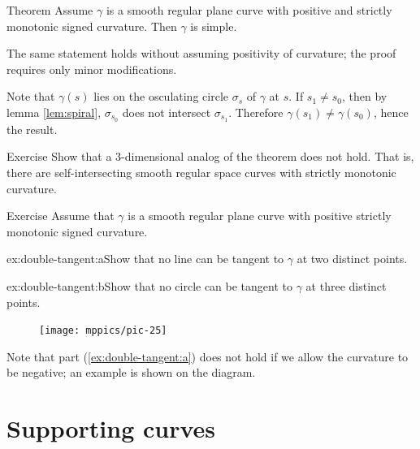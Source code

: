 \begin{thm}{Theorem}\label{thm:spiral}
Assume $\gamma$ is a smooth regular plane curve with positive and strictly monotonic signed curvature. 
Then $\gamma$ is simple.
\end{thm}

The same statement holds without assuming positivity of curvature; the proof requires only minor modifications.

Note that $\gamma(s)$ lies on the osculating circle $\sigma_s$ of $\gamma$ at $s$.
If $s_1\ne s_0$, then by lemma \ref{lem:spiral}, $\sigma_{s_0}$ does not intersect $\sigma_{s_1}$.
Therefore $\gamma(s_1)\ne \gamma(s_0)$,
hence the result.\qeds

\begin{thm}{Exercise}\label{ex:3D-spiral}
Show that a 3-dimensional analog of the theorem does not hold.
That is, there are self-intersecting smooth regular space curves with strictly monotonic curvature.
\end{thm}

\begin{thm}{Exercise}\label{ex:double-tangent}
Assume that $\gamma$ is a smooth regular plane curve with positive strictly monotonic signed curvature.

\begin{subthm}{ex:double-tangent:a}Show that no line can be tangent to $\gamma$ at two distinct points.
\end{subthm}

\begin{subthm}{ex:double-tangent:b}Show that no circle can be tangent to $\gamma$ at three distinct points. 
\end{subthm}

\end{thm} %

{

\begin{figure}
\vskip-4mm
\centering
\texttt{[image: mppics/pic-25]}
\vskip0mm
\end{figure}

Note that part (\ref{ex:double-tangent:a}) does not hold if we allow the curvature to be negative; an example is shown on the diagram.

}

\chapter{Supporting curves}

